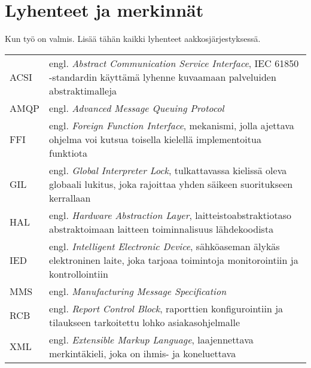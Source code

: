 \chapter*{Lyhenteet ja merkinnät}
\label{ch:lyhenteetjamerkinnat}
\begin{it}
	Kun työ on valmis. Lisää tähän kaikki lyhenteet aakkosjärjestyksessä.
\end{it}

\begin{tabular}[h]{@{} p{} p{} @{}}
	ACSI & engl. \emph{Abstract Communication Service Interface}, IEC 61850 -standardin käyttämä lyhenne kuvaamaan palveluiden abstraktimalleja \\
	AMQP & engl. \emph{Advanced Message Queuing Protocol} \\
	FFI & engl. \emph{Foreign Function Interface}, mekanismi, jolla ajettava ohjelma voi kutsua toisella kielellä implementoitua funktiota\\
	GIL & engl. \emph{Global Interpreter Lock}, tulkattavassa kielissä oleva globaali lukitus, joka rajoittaa yhden säikeen suoritukseen kerrallaan \\
	HAL & engl. \emph{Hardware Abstraction Layer}, laitteistoabstraktiotaso abstraktoimaan laitteen toiminnalisuus lähdekoodista \\
	IED & engl. \emph{Intelligent Electronic Device}, sähköaseman älykäs elektroninen laite, joka tarjoaa toimintoja monitorointiin ja kontrollointiin \\
	MMS & engl. \emph{Manufacturing Message Specification} \\
	RCB & engl. \emph{Report Control Block}, raporttien konfigurointiin ja tilaukseen tarkoitettu lohko asiakasohjelmalle \\
	XML & engl. \emph{Extensible Markup Language}, laajennettava merkintäkieli, joka on ihmis- ja koneluettava
\end{tabular}